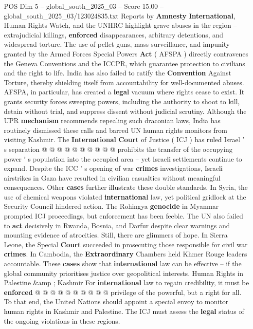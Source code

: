 \begin{textsample}{POS Dim 5 – global\_south\_2025\_03 – Score 15.00 – global\_south\_2025\_03/123024835.txt}
Reports by \textbf{Amnesty} \textbf{International}, Human Rights Watch, and the UNHRC highlight grave abuses in the region -- extrajudicial killings, \textbf{enforced} disappearances, arbitrary detentions, and widespread torture.
The use of pellet guns, mass surveillance, and impunity granted by the Armed Forces Special Powers \textbf{Act} ( AFSPA ) directly contravenes the Geneva Conventions and the ICCPR, which guarantee protection to civilians and the right to life.
India has also failed to ratify the \textbf{Convention} Against Torture, thereby shielding itself from accountability for well-documented abuses.
AFSPA, in particular, has created a \textbf{legal} vacuum where rights cease to exist.
It grants security forces sweeping powers, including the authority to shoot to kill, detain without trial, and suppress dissent without judicial scrutiny.
Although the UPR \textbf{mechanism} recommends repealing such draconian laws, India has routinely dismissed these calls and barred UN human rights monitors from visiting Kashmir.
The \textbf{International} \textbf{Court} of Justice ( ICJ ) has ruled Israel ' s separation @ @ @ @ @ @ @ @ @ @ prohibits the transfer of the occupying power ' s population into the occupied area -- yet Israeli settlements continue to expand.
Despite the ICC ' s opening of war \textbf{crimes} investigations, Israeli airstrikes in Gaza have resulted in civilian casualties without meaningful consequences.
Other \textbf{cases} further illustrate these double standards.
In Syria, the use of chemical weapons violated \textbf{international} law, yet political gridlock at the Security Council hindered action.
The Rohingya \textbf{genocide} in Myanmar prompted ICJ proceedings, but enforcement has been feeble.
The UN also failed to \textbf{act} decisively in Rwanda, Bosnia, and Darfur despite clear warnings and mounting evidence of atrocities.
Still, there are glimmers of hope.
In Sierra Leone, the Special \textbf{Court} succeeded in prosecuting those responsible for civil war \textbf{crimes}.
In Cambodia, the \textbf{Extraordinary} Chambers held Khmer Rouge leaders accountable.
These \textbf{cases} show that \textbf{international} law can be effective -- if the global community prioritises justice over geopolitical interests.
Human Rights in Palestine \&amp ; Kashmir For \textbf{international} law to regain credibility, it must be \textbf{enforced} @ @ @ @ @ @ @ @ @ @ privilege of the powerful, but a right for all.
To that end, the United Nations should appoint a special envoy to monitor human rights in Kashmir and Palestine.
The ICJ must assess the \textbf{legal} status of the ongoing violations in these regions.

\end{textsample}
